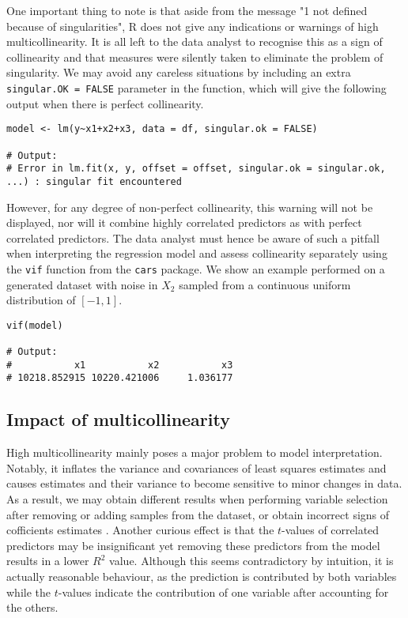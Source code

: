 \documentclass[12pt]{article}
\begin{document}
	One important thing to note is that aside from the message "1 not defined because of singularities", R does not give any indications or warnings of high multicollinearity. It is all left to the data analyst to recognise this as a sign of collinearity and that measures were silently taken to eliminate the problem of singularity. We may avoid any careless situations by including an extra \texttt{singular.OK = FALSE} parameter in the function, which will give the following output when there is perfect collinearity.\\
	\begin{lstlisting}
model <- lm(y~x1+x2+x3, data = df, singular.ok = FALSE)

# Output: 
# Error in lm.fit(x, y, offset = offset, singular.ok = singular.ok, ...) : singular fit encountered
	\end{lstlisting}
	\vspace{2mm}
	\pagebreak
	However, for any degree of non-perfect collinearity, this warning will not be displayed, nor will it combine highly correlated predictors as with perfect correlated predictors. The data analyst must hence be aware of such a pitfall when interpreting the regression model and assess collinearity separately using the \texttt{vif} function from the \texttt{cars} package. We show an example performed on a generated dataset with noise in $X_2$ sampled from a continuous uniform distribution of $[-1,1]$.\\
	
\begin{lstlisting}
vif(model)

# Output: 
#           x1           x2           x3 
# 10218.852915 10220.421006     1.036177 
\end{lstlisting}
	
	\subsection{Impact of multicollinearity}
	
	High multicollinearity mainly poses a major problem to model interpretation. Notably, it inflates the variance and covariances of least squares estimates and causes estimates and their variance to become sensitive to minor changes in data. As a result, we may obtain different results when performing variable selection after removing or adding samples from the dataset, or obtain incorrect signs of cofficients estimates \cite{McClave2018}. Another curious effect is that the $t$-values of correlated predictors may be insignificant yet removing these predictors from the model results in a lower $R^2$ value. Although this seems contradictory by intuition, it is actually reasonable behaviour, as the prediction is contributed by both variables while the $t$-values indicate the contribution of one variable after accounting for the others.\\
	
\end{document}
